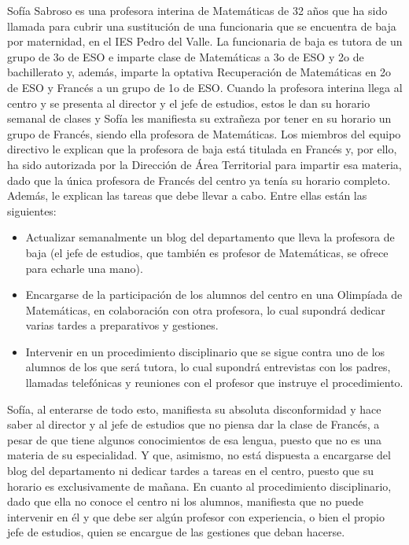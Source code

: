 Sofía Sabroso es una profesora interina de Matemáticas de 32 años que ha sido llamada para cubrir una sustitución de una funcionaria que se encuentra de baja por maternidad, en el IES Pedro del Valle. 
%
La funcionaria de baja es tutora de un grupo de 3o de ESO e imparte clase de Matemáticas a 3o de ESO y 2o de bachillerato y, además, imparte la optativa Recuperación de Matemáticas en 2o de ESO y Francés a un grupo de 1o de ESO. 
%
Cuando la profesora interina llega al centro y se presenta al director y el jefe de estudios, estos le dan su horario semanal de clases y Sofía les manifiesta su extrañeza por tener en su horario un grupo de Francés, siendo ella profesora de Matemáticas. 
%
Los miembros del equipo directivo le explican que la profesora de baja está titulada en Francés y, por ello, ha sido autorizada por la Dirección de Área Territorial para impartir esa materia, dado que la única profesora de Francés del centro ya tenía su horario completo. 
%
Además, le explican las tareas que debe llevar a cabo. Entre ellas están las siguientes:

\begin{itemize}
\item Actualizar semanalmente un blog del departamento que lleva la profesora de baja (el jefe de estudios, que también es profesor de Matemáticas, se ofrece para echarle una mano).
\item Encargarse de la participación de los alumnos del centro en una Olimpíada de Matemáticas, en colaboración con otra profesora, lo cual supondrá dedicar varias tardes a preparativos y gestiones.
\item Intervenir en un procedimiento disciplinario que se sigue contra uno de los alumnos de los que será tutora, lo cual supondrá entrevistas con los padres, llamadas telefónicas y reuniones con el profesor que instruye el procedimiento.
\end{itemize}

Sofía, al enterarse de todo esto, manifiesta su absoluta disconformidad y hace saber al director y al jefe de estudios que no piensa dar la clase de Francés, a pesar de que tiene algunos conocimientos de esa lengua, puesto que no es una materia de su especialidad. 
%
Y que, asimismo, no está dispuesta a encargarse del blog del departamento ni dedicar tardes a tareas en el centro, puesto que su horario es exclusivamente de mañana. 
%
En cuanto al procedimiento disciplinario, dado que ella no conoce el centro ni los alumnos, manifiesta que no puede intervenir en él y que debe ser algún profesor con experiencia, o bien el propio jefe de estudios, quien se encargue de las gestiones que deban hacerse.


